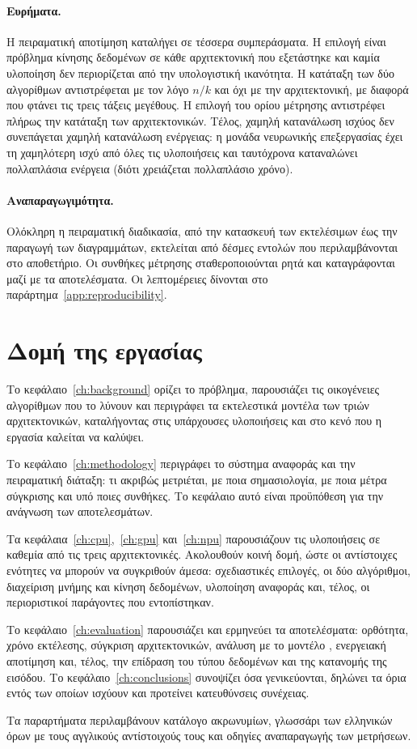 \paragraph{Ευρήματα.} Η πειραματική αποτίμηση καταλήγει σε τέσσερα συμπεράσματα.
Η επιλογή  είναι πρόβλημα κίνησης δεδομένων σε κάθε αρχιτεκτονική που
εξετάστηκε και καμία υλοποίηση δεν περιορίζεται από την υπολογιστική ικανότητα.
Η κατάταξη των δύο αλγορίθμων αντιστρέφεται με τον λόγο $n/k$ και όχι με την
αρχιτεκτονική, με διαφορά που φτάνει τις τρεις τάξεις μεγέθους. Η επιλογή του
ορίου μέτρησης αντιστρέφει πλήρως την κατάταξη των αρχιτεκτονικών. Τέλος,
χαμηλή κατανάλωση ισχύος δεν συνεπάγεται χαμηλή κατανάλωση ενέργειας: η μονάδα
νευρωνικής επεξεργασίας έχει τη χαμηλότερη ισχύ από όλες τις υλοποιήσεις και
ταυτόχρονα καταναλώνει πολλαπλάσια ενέργεια (διότι χρειάζεται πολλαπλάσιο χρόνο).

\paragraph{Αναπαραγωγιμότητα.} Ολόκληρη η πειραματική διαδικασία, από την
κατασκευή των εκτελέσιμων έως την παραγωγή των διαγραμμάτων, εκτελείται από
δέσμες εντολών που περιλαμβάνονται στο αποθετήριο. Οι συνθήκες μέτρησης
σταθεροποιούνται ρητά και καταγράφονται μαζί με τα αποτελέσματα. Οι λεπτομέρειες
δίνονται στο παράρτημα~\ref{app:reproducibility}.

\section{Δομή της εργασίας}
\label{sec:intro-outline}

Το κεφάλαιο~\ref{ch:background} ορίζει το πρόβλημα, παρουσιάζει τις οικογένειες
αλγορίθμων που το λύνουν και περιγράφει τα εκτελεστικά μοντέλα των τριών
αρχιτεκτονικών, καταλήγοντας στις υπάρχουσες υλοποιήσεις και στο κενό που η
εργασία καλείται να καλύψει.

Το κεφάλαιο~\ref{ch:methodology} περιγράφει το σύστημα αναφοράς και την
πειραματική διάταξη: τι ακριβώς μετριέται, με ποια σημασιολογία, με ποια μέτρα
σύγκρισης και υπό ποιες συνθήκες. Το κεφάλαιο αυτό είναι προϋπόθεση για την
ανάγνωση των αποτελεσμάτων.

Τα κεφάλαια~\ref{ch:cpu},~\ref{ch:gpu} και~\ref{ch:npu} παρουσιάζουν τις
υλοποιήσεις σε καθεμία από τις τρεις αρχιτεκτονικές. Ακολουθούν κοινή δομή, ώστε
οι αντίστοιχες ενότητες να μπορούν να συγκριθούν άμεσα: σχεδιαστικές επιλογές,
οι δύο αλγόριθμοι, διαχείριση μνήμης και κίνηση δεδομένων, υλοποίηση αναφοράς
και, τέλος, οι περιοριστικοί παράγοντες που εντοπίστηκαν.

Το κεφάλαιο~\ref{ch:evaluation} παρουσιάζει και ερμηνεύει τα αποτελέσματα:
ορθότητα, χρόνο εκτέλεσης, σύγκριση αρχιτεκτονικών, ανάλυση με το μοντέλο
, ενεργειακή αποτίμηση και, τέλος, την επίδραση του τύπου δεδομένων
και της κατανομής της εισόδου. Το κεφάλαιο~\ref{ch:conclusions} συνοψίζει όσα
γενικεύονται, δηλώνει τα όρια εντός των οποίων ισχύουν και προτείνει κατευθύνσεις
συνέχειας.

Τα παραρτήματα περιλαμβάνουν κατάλογο ακρωνυμίων, γλωσσάρι των ελληνικών όρων με
τους αγγλικούς αντίστοιχούς τους και οδηγίες αναπαραγωγής των μετρήσεων.
